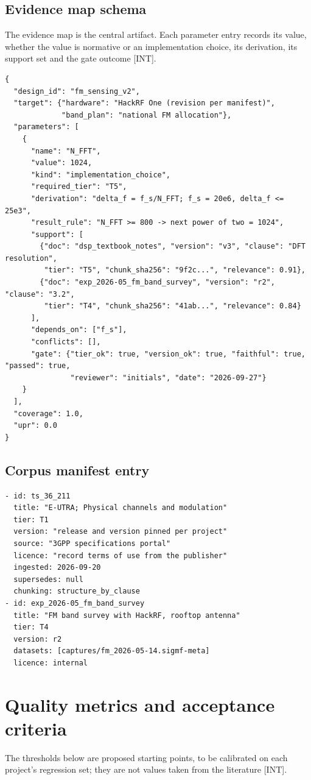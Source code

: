 \documentclass[11pt,a4paper]{article}
\newcommand{\prov}[1]{\textsf{\footnotesize[#1]}}
\begin{document}
\subsection{Evidence map schema}
The evidence map is the central artifact. Each parameter entry records its value, whether the value is normative or an implementation choice, its derivation, its support set and the gate outcome \prov{INT}.

\begin{lstlisting}
{
  "design_id": "fm_sensing_v2",
  "target": {"hardware": "HackRF One (revision per manifest)",
             "band_plan": "national FM allocation"},
  "parameters": [
    {
      "name": "N_FFT",
      "value": 1024,
      "kind": "implementation_choice",
      "required_tier": "T5",
      "derivation": "delta_f = f_s/N_FFT; f_s = 20e6, delta_f <= 25e3",
      "result_rule": "N_FFT >= 800 -> next power of two = 1024",
      "support": [
        {"doc": "dsp_textbook_notes", "version": "v3", "clause": "DFT resolution",
         "tier": "T5", "chunk_sha256": "9f2c...", "relevance": 0.91},
        {"doc": "exp_2026-05_fm_band_survey", "version": "r2", "clause": "3.2",
         "tier": "T4", "chunk_sha256": "41ab...", "relevance": 0.84}
      ],
      "depends_on": ["f_s"],
      "conflicts": [],
      "gate": {"tier_ok": true, "version_ok": true, "faithful": true, "passed": true,
               "reviewer": "initials", "date": "2026-09-27"}
    }
  ],
  "coverage": 1.0,
  "upr": 0.0
}
\end{lstlisting}
\subsection{Corpus manifest entry}
\begin{lstlisting}
- id: ts_36_211
  title: "E-UTRA; Physical channels and modulation"
  tier: T1
  version: "release and version pinned per project"
  source: "3GPP specifications portal"
  licence: "record terms of use from the publisher"
  ingested: 2026-09-20
  supersedes: null
  chunking: structure_by_clause
- id: exp_2026-05_fm_band_survey
  title: "FM band survey with HackRF, rooftop antenna"
  tier: T4
  version: r2
  datasets: [captures/fm_2026-05-14.sigmf-meta]
  licence: internal
\end{lstlisting}
\section{Quality metrics and acceptance criteria}
The thresholds below are proposed starting points, to be calibrated on each project's regression set; they are not values taken from the literature \prov{INT}.
\end{document}
